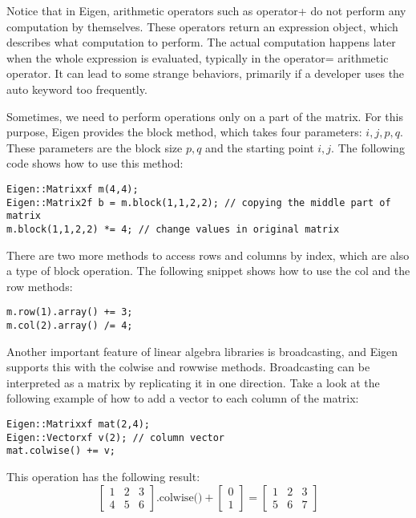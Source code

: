 \documentclass[12pt]{article}
\begin{document}
Notice that in Eigen, arithmetic operators such as operator+ do not perform any computation by themselves. These operators return an expression object, which describes what computation to perform. The actual computation happens later when the whole expression is evaluated, typically in the operator= arithmetic operator. It can lead to some strange behaviors, primarily if a developer uses the auto keyword too frequently.

Sometimes, we need to perform operations only on a part of the matrix. For this purpose, Eigen provides the block method, which takes four parameters: $i, j, p, q .$ These parameters are the block size $p, q$ and the starting point $i, j .$ The following code shows how to use this method:

\begin{verbatim}
Eigen::Matrixxf m(4,4);
Eigen::Matrix2f b = m.block(1,1,2,2); // copying the middle part of matrix 
m.block(1,1,2,2) *= 4; // change values in original matrix    
\end{verbatim}

There are two more methods to access rows and columns by index, which are also a type of block operation. The following snippet shows how to use the $\mathrm{col}$ and the row methods:

\begin{verbatim}
m.row(1).array() += 3; 
m.col(2).array() /= 4;    
\end{verbatim}

Another important feature of linear algebra libraries is broadcasting, and Eigen supports this with the colwise and rowwise methods. Broadcasting can be interpreted as a matrix by replicating it in one direction. Take a look at the following example of how to add a vector to each column of the matrix:

\begin{verbatim}
Eigen::Matrixxf mat(2,4); 
Eigen::Vectorxf v(2); // column vector 
mat.colwise() += v;    
\end{verbatim}

This operation has the following result:
$$\left[\begin{array}{lll}1 & 2 & 3 \\ 4 & 5 & 6\end{array}\right] \mbox{.colwise()}+\left[\begin{array}{l}0 \\ 1\end{array}\right]=\left[\begin{array}{lll}1 & 2 & 3 \\ 5 & 6 & 7\end{array}\right]$$
\end{document}
